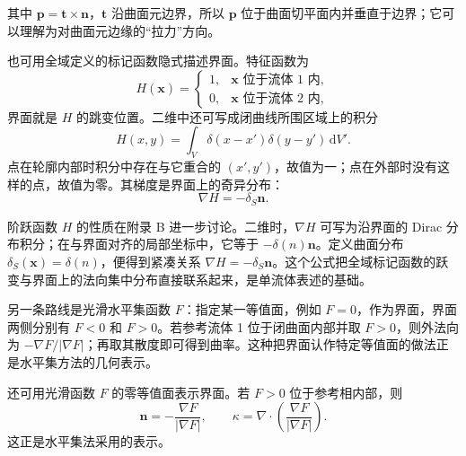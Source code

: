 \documentclass[11pt,a4paper,openany,fontset=none]{ctexbook}
\newenvironment{sourceblock}
  {\par\addvspace{0.65\baselineskip}\noindent\begin{minipage}{\linewidth}\centering}
  {\end{minipage}\par\addvspace{0.48\baselineskip}}
\begin{document}
其中 $\bm p=\bm t\times\bm n$，$\bm t$ 沿曲面元边界，所以 $\bm p$ 位于曲面切平面内并垂直于边界；它可以理解为对曲面元边缘的“拉力”方向。

\begin{sourceblock}
\end{sourceblock}

也可用全域定义的标记函数隐式描述界面。特征函数为
\begin{equation}
 H(\bm x)=\begin{cases}1,&\bm x\text{ 位于流体 1 内},\\0,&\bm x\text{ 位于流体 2 内},\end{cases} \tag{2.37}
\end{equation}
界面就是 $H$ 的跳变位置。二维中还可写成闭曲线所围区域上的积分
\begin{equation}
H(x,y)=\int_V\delta(x-x')\delta(y-y')\,\mathrm dV'. \tag{2.38}
\end{equation}
点在轮廓内部时积分中存在与它重合的 $(x',y')$，故值为一；点在外部时没有这样的点，故值为零。其梯度是界面上的奇异分布：
\begin{equation}
 \nabla H=-\delta_S\bm n. \tag{2.40}
\end{equation}

\begin{sourceblock}
\end{sourceblock}

阶跃函数 $H$ 的性质在附录 B 进一步讨论。二维时，$\nabla H$ 可写为沿界面的 Dirac 分布积分；在与界面对齐的局部坐标中，它等于 $-\delta(n)\bm n$。定义曲面分布 $\delta_S(\bm x)=\delta(n)$，便得到紧凑关系 $\nabla H=-\delta_S\bm n$。这个公式把全域标记函数的跃变与界面上的法向集中分布直接联系起来，是单流体表述的基础。

另一条路线是光滑水平集函数 $F$：指定某一等值面，例如 $F=0$，作为界面，界面两侧分别有 $F<0$ 和 $F>0$。若参考流体 1 位于闭曲面内部并取 $F>0$，则外法向为 $-\nabla F/|\nabla F|$；再取其散度即可得到曲率。这种把界面认作特定等值面的做法正是水平集方法的几何表示。

还可用光滑函数 $F$ 的零等值面表示界面。若 $F>0$ 位于参考相内部，则
\begin{equation}
 \bm n=-\frac{\nabla F}{|\nabla F|},\qquad
 \kappa=\nabla\cdot\left(\frac{\nabla F}{|\nabla F|}\right). \tag{2.41--2.42}
\end{equation}
这正是水平集法采用的表示。
\end{document}
